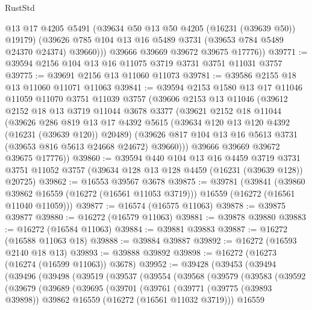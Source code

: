 \begin{lexlean}{RustStd}
\begin{coremodule}
            @13
            @17
            @4205
            @5491
            (@39634 @50 @13 @50 @4205 (@16231 (@39639 @50)) @19179)
            (@39626 @785 @104 @13 @16 @5489 @3731 (@39653 @784 @5489 @24370 @24374) @39660)))
        @39666
        @39669
        @39672
        @39675
        @17776))
@39771 := @39594 @2156 @104 @13 @16 @11075 @3719 @3731 @3751 @11031 @3757
@39775 := @39691 @2156 @13 @11060 @11073
@39781 := @39586 @2155 @18 @13 @11060 @11071 @11063
@39841 := @39594
    @2153
    @1580
    @13
    @17
    @11046
    @11059
    @11070
    @3751
    @11039
    @3757
    (@39606
      @2153
      @13
      @11046
      (@39612
        @2152
        @18
        @13
        @3719
        @11044
        @3678
        @3377
        (@39621
          @2152
          @18
          @11044
          (@39626
            @286
            @819
            @13
            @17
            @4392
            @5615
            (@39634 @120 @13 @120 @4392 (@16231 (@39639 @120)) @20489)
            (@39626 @817 @104 @13 @16 @5613 @3731 (@39653 @816 @5613 @24668 @24672) @39660)))
        @39666
        @39669
        @39672
        @39675
        @17776))
@39860 := @39594
    @440
    @104
    @13
    @16
    @4459
    @3719
    @3731
    @3751
    @11052
    @3757
    (@39634 @128 @13 @128 @4459 (@16231 (@39639 @128)) @20725)
@39862 := @16553 @39567 @3678
@39875 := @39781
    (@39841
      (@39860 @39862 @16559 (@16272 (@16561 @11053 @3719)))
      @16559
      (@16272 (@16561 @11040 @11059)))
@39877 := @16574 (@16575 @11063)
@39878 := @39875 @39877
@39880 := @16272 (@16579 @11063)
@39881 := @39878 @39880
@39883 := @16272 (@16584 @11063)
@39884 := @39881 @39883
@39887 := @16272 (@16588 @11063 @18)
@39888 := @39884 @39887
@39892 := @16272 (@16593 @2140 @18 @13)
@39893 := @39888 @39892
@39898 := @16272 (@16273 (@16274 (@16599 @11063)) @3678)
@39952 := @39428
    (@39453
      (@39494
        (@39496
          (@39498
            (@39519
              (@39537
                (@39554
                  (@39568
                    (@39579
                      (@39583
                        (@39592
                          (@39679
                            (@39689
                              (@39695
                                (@39701
                                  (@39761
                                    (@39771
                                      (@39775 (@39893 @39898))
                                      @39862
                                      @16559
                                      (@16272 (@16561 @11032 @3719)))
                                    @16559

\end{coremodule}
\end{lexlean}
